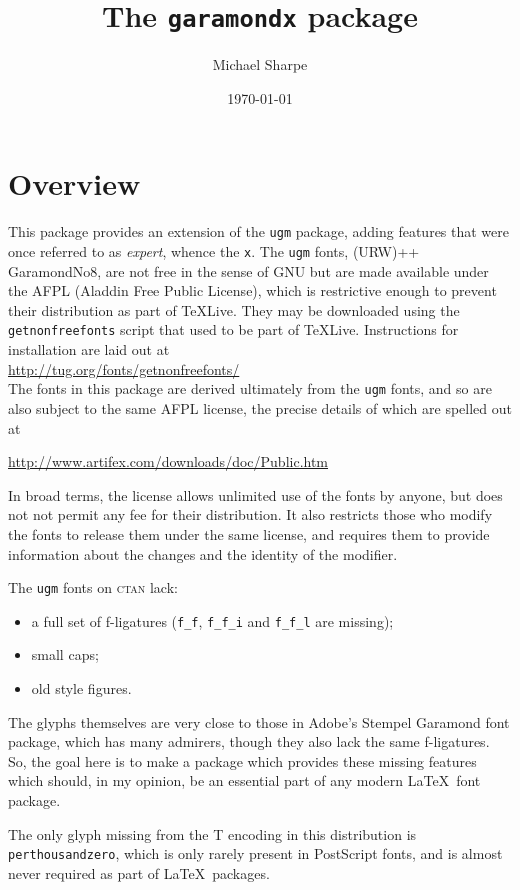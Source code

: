 \documentclass[11pt]{article}
\title{The \texttt{garamondx} package}
\author{Michael Sharpe}
\date{\today}  %
\begin{document}
\maketitle
\section{Overview}
This package provides an extension of the \texttt{ugm} package, adding features that were once referred to as \emph{expert}, whence the \texttt{x}. The \texttt{ugm} fonts, (URW)++ GaramondNo8, are not free in the sense of GNU but are made available under the AFPL (Aladdin Free Public License), which is restrictive enough to prevent their distribution as part of \TeX Live. They may be downloaded  using the \texttt{getnonfreefonts} script that used to be part of \TeX Live. Instructions for installation are laid out at\\
\url{http://tug.org/fonts/getnonfreefonts/}\\
The fonts in this package are derived ultimately from the \texttt{ugm} fonts, and so are also subject to the same AFPL license, the precise details of which are spelled out at

\url{http://www.artifex.com/downloads/doc/Public.htm}

In broad terms, the license allows unlimited use of the fonts by anyone, but does not not permit any fee for their distribution. It also restricts those who modify the fonts to release them under the same license, and requires them to provide information about the changes and the identity of the modifier.

The \texttt{ugm} fonts on \textsc{ctan} lack:
\begin{itemize}
\item
a full set of f-ligatures (\verb|f_f|, \verb|f_f_i| and \verb|f_f_l| are missing);
\item small caps;
\item old style figures.
\end{itemize} 
The glyphs themselves are very close to those in Adobe's Stempel Garamond font package, which has many admirers, though they also lack the same f-ligatures. So, the goal here is to make a package which provides these missing features which should, in my opinion, be an essential part of any modern \LaTeX\ font package.

The only glyph missing from the T encoding in this distribution is \texttt{perthousandzero}, which is only rarely present in PostScript fonts, and is almost never required as part of \LaTeX\ packages.
\end{document}
